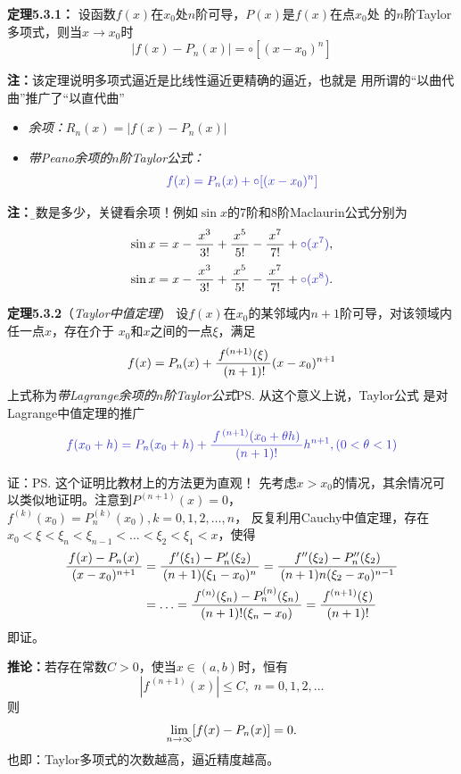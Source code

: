 {\bf 定理5.3.1：}
设函数$f(x)$在$x_0$处$n$阶可导，$P(x)$是$f(x)$在点$x_0$处
的$n$阶Taylor多项式，则当$x\to x_0$时
$${|f(x)-P_n(x)|=\circ[(x-x_0)^n]}$$

{\bf 注：}该定理说明多项式逼近是比线性逼近更精确的逼近，也就是
用所谓的“以曲代曲”推广了“以直代曲”

\begin{itemize}
  \setlength{\itemindent}{1cm}
  \item {\it 余项：}$R_n(x)=|f(x)-P_n(x)|$ 
  \item {\it 带Peano余项的$n$阶Taylor公式：}
  $${\b f(x)=P_n(x)+\circ[(x-x_0)^n]}$$
\end{itemize}

{\bf 注：}{\b 阶数是多少，关键看余项！}例如$\sin x$的7阶和8阶Maclaurin公式分别为
$$\sin x=x-\df{x^3}{3!}+\df{x^5}{5!}-\df{x^7}{7!}+{\b\circ(x^7)},$$
$$\sin x=x-\df{x^3}{3!}+\df{x^5}{5!}-\df{x^7}{7!}+{\b\circ(x^8)}.$$

{\bf 定理5.3.2}（{\it Taylor中值定理}）
设$f(x)$在$x_0$的某邻域内$n+1$阶可导，对该领域内任一点$x$，存在介于
$x_0$和$x$之间的一点$\xi$，满足
$${f(x)=P_n(x)+\displaystyle\frac{\,{f^{(n+1)}(\xi)}\,}{\,{\,(n+1)!}\,}(x-x_0)^{n+1}}$$
上式称为{\it 带Lagrange余项的$n$阶Taylor公式}\ps{从这个意义上说，Taylor公式
是对Lagrange中值定理的推广}
$${\b f(x_0+h)=P_n(x_0+h)+\df{f^{\,(n+1)}(x_0+\theta
h)}{(n+1)!}h^{n+1},(0<\theta<1)}$$

证：\ps{这个证明比教材上的方法更为直观！}
先考虑$x>x_0$的情况，其余情况可以类似地证明。注意到$P^{(n+1)}(x)=0$，
$f^{(k)}(x_0)=P^{(k)}_n(x_0),k=0,1,2,\ldots,n$，
反复利用Cauchy中值定理，存在$x_0<\xi<\xi_n<\xi_{n-1}
<\ldots<\xi_2<\xi_1<x$，使得
\begin{align}
	\displaystyle\frac{\,{f(x)-P_n(x)}\,}{\,{(x-x_0)^{n+1}}\,}
	&=\displaystyle\frac{\,{f'(\xi_1)-P'_n(\xi_2)}\,}{\,{(n+1)(\xi_1-x_0)^{n}}\,}
	=\displaystyle\frac{\,{f''(\xi_2)-P''_n(\xi_2)}\,}{\,{(n+1)n(\xi_2-x_0)^{n-1}}\,}\notag\\
	&=\ldots=\displaystyle\frac{\,{f^{(n)}(\xi_n)-P^{(n)}_n(\xi_n)}\,}{\,{(n+1)!(\xi_n-x_0)}\,}
	=\displaystyle\frac{\,{f^{(n+1)}(\xi)}\,}{\,{(n+1)!}\,}\notag
\end{align}
即证。

{\bf 推论：}若存在常数$C>0$，使当$x\in(a,b)$时，恒有
$$|f^{\,(n+1)}(x)|\leq C,\;n=0,1,2,\ldots$$
则
$$\lim\limits_{n\to\infty} [f(x)-P_n(x)]=0.$$
也即：Taylor多项式的次数越高，逼近精度越高。

